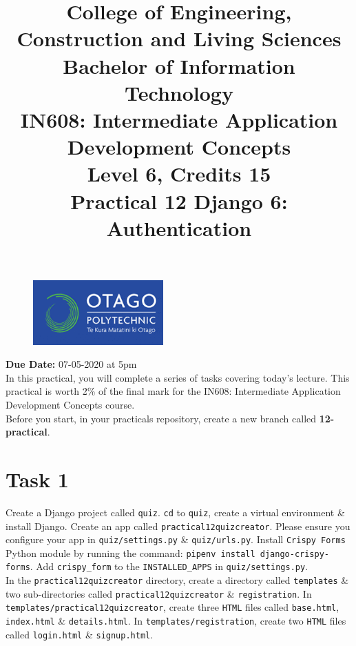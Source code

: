 \documentclass{article}
\author{}
\begin{document}
\begin{figure}
	\centering
	\includegraphics[width=50mm]{./img/logo.png}
\end{figure}

\title{College of Engineering, Construction and Living Sciences\\Bachelor of Information Technology\\IN608: Intermediate Application Development Concepts\\Level 6, Credits 15\\\textbf{Practical 12 Django 6: Authentication}} 
\date{}
\maketitle

\textbf{Due Date:} 07-05-2020 at 5pm \\

In this practical, you will complete a series of tasks covering today's lecture. This practical is worth 2\% of the final mark for the IN608: Intermediate Application Development Concepts course. \\

Before you start, in your practicals repository, create a new branch called \textbf{12-practical}.

\section*{Task 1} 
Create a Django project called \texttt{quiz}. \texttt{cd} to \texttt{quiz}, create a virtual environment \& install Django. Create an app called \texttt{practical12quizcreator}. Please ensure you configure your app in \texttt{quiz/settings.py} \& \texttt{quiz/urls.py}. Install \texttt{Crispy Forms} Python module by running the command: \texttt{pipenv install django-crispy-forms}. Add \texttt{crispy\_form} to the \texttt{INSTALLED\_APPS} in \texttt{quiz/settings.py}. \\

In the \texttt{practical12quizcreator} directory, create a directory called \texttt{templates} \& two sub-directories called \texttt{practical12quizcreator} \& \texttt{registration}. In \texttt{templates/practical12quizcreator}, create three \texttt{HTML} files called \texttt{base.html}, \texttt{index.html} \& \texttt{details.html}. In \texttt{templates/registration}, create two \texttt{HTML} files called \texttt{login.html} \& \texttt{signup.html}. \\
\end{document}
